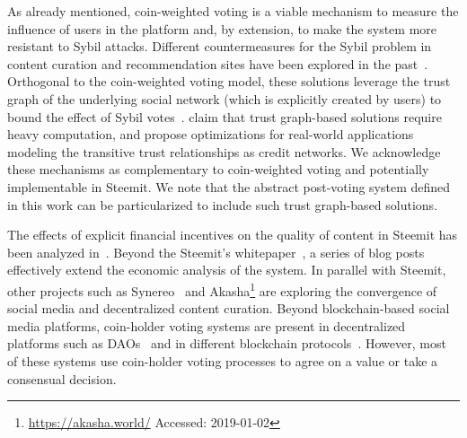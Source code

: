   As already mentioned, coin-weighted voting is a viable mechanism to measure
  the influence of users in the platform and, by extension, to make the system
  more resistant to Sybil attacks. Different countermeasures for the Sybil
  problem in content curation and recommendation sites have been explored in the
  past~\cite{molavi2013iolaus,tran2009sybil,yu2009dsybil,meo2017using}.
  Orthogonal to the coin-weighted voting model, these solutions leverage the
  trust graph of the underlying social network (which is explicitly created by
  users) to bound the effect of Sybil
  votes~\cite{molavi2013iolaus,tran2009sybil,yu2009dsybil}.
  \cite{viswanath2012canal} claim that trust graph-based solutions require heavy
  computation, and propose optimizations for real-world applications modeling
  the transitive trust relationships as credit networks. We acknowledge these
  mechanisms as complementary to coin-weighted voting and potentially
  implementable in Steemit. We note that the abstract post-voting system defined
  in this work can be particularized to include such trust graph-based
  solutions.

  The effects of explicit financial incentives on the quality of content in
  Steemit has been analyzed in~\cite{thelwall2017can}. Beyond the Steemit's
  whitepaper~\cite{steemit}, a series of blog
  posts~\cite{curationRewards,selfvoters} effectively extend the economic
  analysis of the system. In parallel with Steemit, other projects such as
  Synereo~\cite{synereo} and Akasha\footnote{\url{https://akasha.world/}
  Accessed: 2019-01-02} are exploring the convergence of social media and
  decentralized content curation. Beyond blockchain-based social media
  platforms, coin-holder voting systems are present in decentralized platforms
  such as DAOs~\cite{darkdaos} and in different blockchain
  protocols~\cite{dash,tezos}. However, most of these systems use coin-holder
  voting processes to agree on a value or take a consensual decision.
